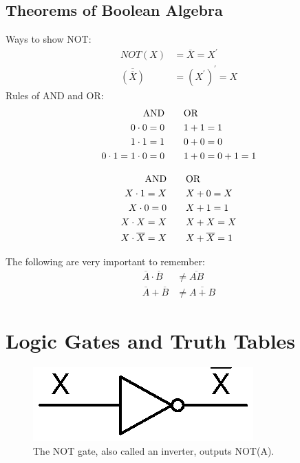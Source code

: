 \subsection{Theorems of Boolean Algebra}
Ways to show NOT:
\begin{subequations}
	\begin{align}
	NOT(X) &= \overline{X} = X^{\prime} \\
	\overline{(\overline{X})} &= \left(X^{\prime}\right)^{\prime}= X
	\end{align}
\end{subequations}
Rules of AND and OR:
\begin{subequations}
	\begin{align}
	\mathrm{AND} \qquad & \mathrm{OR}\notag\\
	0\cdot0 = 0 \qquad & 1+1 = 1\\
	1\cdot1 = 1 \qquad & 0+0 = 0\\
	0\cdot1 = 1\cdot0 = 0 \qquad & 1 + 0 = 0 + 1 = 1
	\end{align}
\end{subequations}

\begin{subequations}
	\begin{align}
	\mathrm{AND} \qquad & \mathrm{OR}\notag\\
	X\cdot1 = X \qquad & X + 0 = X\\	
	X\cdot0 = 0 \qquad & X + 1 = 1\\	
	X\cdot X = X \qquad & X + X = X\\	
	X\cdot\overline{X} = X \qquad & X + \overline{X} = 1
	\end{align}
\end{subequations}

The following are very important to remember:
\begin{subequations}
	\begin{align}
		\overline{A} \cdot \overline{B} &\neq \overline{AB} \\
		\overline{A} + \overline{B} &\neq \overline{A + B} 
	\end{align}
\end{subequations}

\section{Logic Gates and Truth Tables}
\begin{figure}[!htb]
	\centering
	\includegraphics[scale=0.7]{logic/NOT.eps}
	\caption{The NOT gate, also called an inverter, outputs NOT(A).}
	\label{fig:notgate}
\end{figure} 

